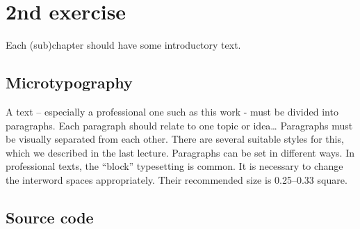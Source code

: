 \chapter{2nd exercise}

Each (sub)chapter should have some introductory text.

\section{Microtypography}

A text -- especially a professional one such as this work - must be divided into paragraphs. Each paragraph should relate to one topic or idea\dots{} Paragraphs must be visually separated from each other. There are several suitable styles for this, which we described in the last lecture. Paragraphs can be set in different ways. In professional texts, the ``block'' typesetting is common. It is necessary to change the interword spaces appropriately. Their recommended size is 0.25--0.33 square.

\section{Source code}


    



